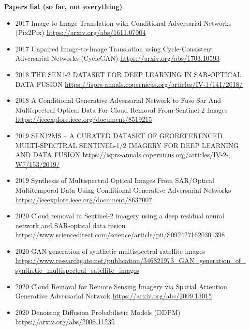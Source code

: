 \textbf{Papers list (so far, not everything)}
\begin{itemize}
    \item 2017 Image-to-Image Translation with Conditional Adversarial Networks (Pix2Pix)
    \url{https://arxiv.org/abs/1611.07004}

    \item 2017 Unpaired Image-to-Image Translation using Cycle-Consistent Adversarial Networks (CycleGAN)
    \url{https://arxiv.org/abs/1703.10593}

    \item 2018 THE SEN1-2 DATASET FOR DEEP LEARNING IN SAR-OPTICAL DATA FUSION
    \url{https://isprs-annals.copernicus.org/articles/IV-1/141/2018/}

    \item 2018 A Conditional Generative Adversarial Network to Fuse Sar And Multispectral Optical Data For Cloud Removal From Sentinel-2 Images
    \url{https://ieeexplore.ieee.org/document/8519215}

    \item 2019 SEN12MS – A CURATED DATASET OF GEOREFERENCED MULTI-SPECTRAL SENTINEL-1/2 IMAGERY FOR DEEP LEARNING AND DATA FUSION
    \url{https://isprs-annals.copernicus.org/articles/IV-2-W7/153/2019/}

    \item 2019 Synthesis of Multispectral Optical Images From SAR/Optical Multitemporal Data Using Conditional Generative Adversarial Networks
    \url{https://ieeexplore.ieee.org/document/8637007}

    \item 2020 Cloud removal in Sentinel-2 imagery using a deep residual neural network and SAR-optical data fusion
    \url{https://www.sciencedirect.com/science/article/pii/S0924271620301398}

    \item 2020 GAN generation of synthetic multispectral satellite images
    \url{https://www.researchgate.net/publication/346821973_GAN_generation_of_synthetic_multispectral_satellite_images}


    
    \item 2020 Cloud Removal for Remote Sensing Imagery via Spatial Attention Generative Adversarial Network
    \url{https://arxiv.org/abs/2009.13015}

    \item 2020 Denoising Diffusion Probabilistic Models (DDPM)
    \url{https://arxiv.org/abs/2006.11239}


\end{itemize}
